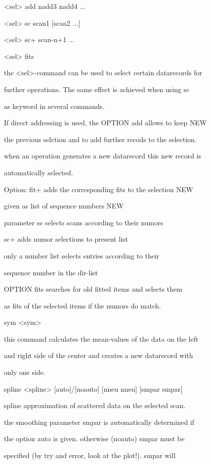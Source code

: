 \documentclass[]{article}
\begin{document}
\textless{}sel\textgreater{} add nadd3 nadd4 ...

\textless{}sel\textgreater{} sc scan1 {[}scan2 ...{]}

\textless{}sel\textgreater{} sc+ scan-n+1 ...

\textless{}sel\textgreater{} fits

the \textless{}sel\textgreater{}-command can be used to select certain
datarecords for

further operations. The same effect is achieved when using sc

as keyword in several commands.

If direct addressing is used, the OPTION add allows to keep NEW

the previous selction and to add further recods to the selection.

when an operation generates a new datarecord this new record is

automatically selected.

Option: fit+ adds the corresponding fits to the selection NEW

given as list of sequence numbers NEW

parameter sc selects scans according to their numors

sc+ adds numor selections to present list

only a number list selects entries according to their

sequence number in the dir-list

OPTION fits searches for old fitted items and selects them

as fits of the selected items if the numors do match.

sym \textless{}sym\textgreater{}

this command calculates the mean-values of the data on the left

and right side of the center and creates a new datarecord with

only one side.

spline \textless{}spline\textgreater{} {[}auto{]}/{[}noauto{]} {[}nneu
nneu{]} {[}smpar smpar{]}

spline approximation of scattered data on the selected scan.

the smoothing parameter smpar is automatically determined if

the option auto is given. otherwise (noauto) smpar must be

specified (by try and error, look at the plot!). smpar will
\end{document}

